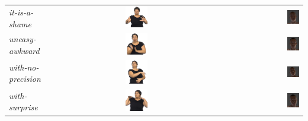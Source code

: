 \documentclass[../main.tex]{subfiles}
\begin{document}
\begin{longtable}{|l|c|r|}
    \emph{it-is-a-shame} & \includegraphics[width=0.15\textwidth]{chapters/facial_expressions/images/original_facial_expressions/it_is_a_shame.png} & \includegraphics[width=0.15\textwidth]{chapters/facial_expressions/images/flame_facial_exps/it_is_a_shame.png} \\
    \emph{uneasy-awkward} & \includegraphics[width=0.15\textwidth]{chapters/facial_expressions/images/original_facial_expressions/uneasy_awkward.png} & \includegraphics[width=0.15\textwidth]{chapters/facial_expressions/images/flame_facial_exps/uneasy_awkward.png} \\
    \emph{with-no-precision} & \includegraphics[width=0.15\textwidth]{chapters/facial_expressions/images/original_facial_expressions/with_no_precision.png} & \includegraphics[width=0.15\textwidth]{chapters/facial_expressions/images/flame_facial_exps/with_no_precision.png} \\
    \emph{with-surprise} & \includegraphics[width=0.15\textwidth]{chapters/facial_expressions/images/original_facial_expressions/with_surprise.png} & \includegraphics[width=0.15\textwidth]{chapters/facial_expressions/images/flame_facial_exps/with_surprise.png} \\

\end{longtable}
\end{document}
